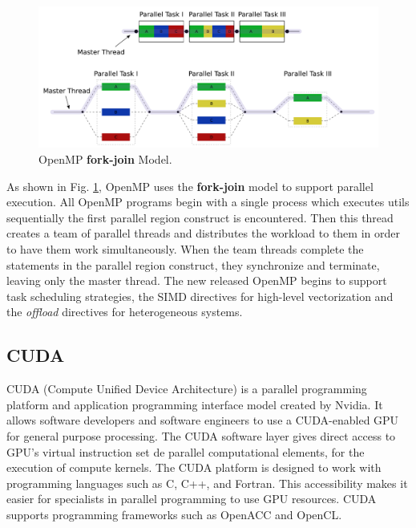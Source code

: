 \begin{figure}[htbp]
	\centering
	\includegraphics[width=6.3in]{fig/Fork_join.pdf}
	\caption{OpenMP \textbf{fork-join} Model.}
	\label{openmp_fork_join}
\end{figure}

As shown in Fig. \ref{openmp_fork_join}, OpenMP uses the \textbf{fork-join} model to support parallel execution. All OpenMP programs begin with a single process which executes utils sequentially the first parallel region construct is encountered.  Then this thread creates a team of parallel threads and distributes the workload to them in order to have them work simultaneously. When the team threads complete the statements in the parallel region construct, they synchronize and terminate, leaving only the master thread. The new released OpenMP begins to support task scheduling strategies, the SIMD directives for high-level vectorization and the \textit{offload} directives for heterogeneous systems.

\subsection{CUDA}

CUDA (Compute Unified Device Architecture) \cite{nvidia2011nvidia} is a parallel programming platform and application programming interface model created by Nvidia. It allows software developers and software engineers to use a CUDA-enabled GPU for general purpose processing. The CUDA software layer gives direct access to GPU's virtual instruction set de parallel computational elements, for the execution of compute kernels. The CUDA platform is designed to work with programming languages such as C, C++, and Fortran. This accessibility makes it easier for specialists in parallel programming to use GPU resources. CUDA supports programming frameworks such as OpenACC and OpenCL.

